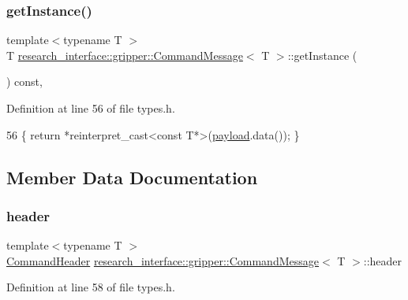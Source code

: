 \subsubsection{\texorpdfstring{get\+Instance()}{getInstance()}}
{\footnotesize\ttfamily template$<$typename T $>$ \\
T \hyperlink{structresearch__interface_1_1gripper_1_1CommandMessage}{research\+\_\+interface\+::gripper\+::\+Command\+Message}$<$ T $>$\+::get\+Instance (\begin{DoxyParamCaption}{ }\end{DoxyParamCaption}) const\hspace{0.3cm}{\ttfamily [inline]}, {\ttfamily [noexcept]}}



Definition at line 56 of file types.\+h.


\begin{DoxyCode}
56 \{ \textcolor{keywordflow}{return} *\textcolor{keyword}{reinterpret\_cast<}\textcolor{keyword}{const }T*\textcolor{keyword}{>}(\hyperlink{structresearch__interface_1_1gripper_1_1CommandMessage_ac59db82ea1c4c1da955d22f8eac3c2df}{payload}.data()); \}
\end{DoxyCode}


\subsection{Member Data Documentation}
\mbox{\label{structresearch__interface_1_1gripper_1_1CommandMessage_ae32966ef012e8fc0355a775944a8cc55}} 
\subsubsection{\texorpdfstring{header}{header}}
{\footnotesize\ttfamily template$<$typename T $>$ \\
\hyperlink{structresearch__interface_1_1gripper_1_1CommandHeader}{Command\+Header} \hyperlink{structresearch__interface_1_1gripper_1_1CommandMessage}{research\+\_\+interface\+::gripper\+::\+Command\+Message}$<$ T $>$\+::header}



Definition at line 58 of file types.\+h.

